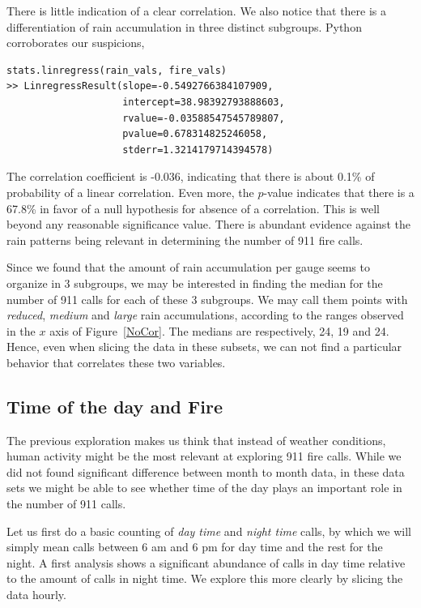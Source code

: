 \documentclass[12pt,a4paper]{article}
\begin{document}
There is little indication of a clear correlation. We also notice that there is a differentiation of rain accumulation in three distinct subgroups. Python corroborates our suspicions,

\begin{verbatim}
stats.linregress(rain_vals, fire_vals)
>> LinregressResult(slope=-0.5492766384107909,
                    intercept=38.98392793888603,
                    rvalue=-0.03588547545789807,
                    pvalue=0.678314825246058,
                    stderr=1.3214179714394578)
\end{verbatim}


The correlation coefficient is -0.036, indicating that there is about 0.1\% of probability of a linear correlation. Even more, the $p$-value indicates that there is a 67.8\% in favor of a null hypothesis for absence of a correlation. This is well beyond any reasonable significance value. There is abundant evidence against the rain patterns being relevant in determining the number of 911 fire calls.

Since we found that the amount of rain accumulation per gauge seems to organize in 3 subgroups, we may be interested in finding the median for the number of 911 calls for each of these 3 subgroups. We may call them points with \emph{reduced}, \emph{medium} and \emph{large} rain accumulations, according to the ranges observed in the $x$ axis of Figure~\ref{NoCor}. The medians are respectively, 24, 19 and 24. Hence, even when slicing the data in these subsets, we can not find a particular behavior that correlates these two variables.

\subsection{Time of the day and Fire}


The previous exploration makes us think that instead of weather conditions, human activity might be the most relevant at exploring 911 fire calls. While we did not found significant difference between month to month data, in these data sets we might be able to see whether time of the day plays an important role in the number of 911 calls.

Let us first do a basic counting of \emph{day time} and \emph{night time} calls, by which we will simply mean calls between 6 am and 6 pm for day time and the rest for the night. A first analysis shows a significant abundance of calls in day time relative to the amount of calls in night time. We explore this more clearly by slicing the data hourly.
\end{document}
